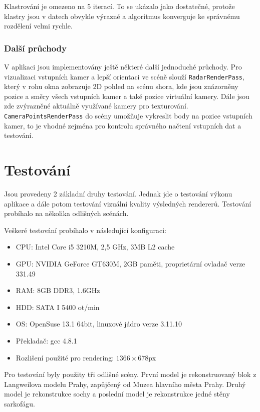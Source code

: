 \documentclass[11pt,twoside,a4paper]{book}
\begin{document}
Klastrování je omezeno na 5 iterací. To se ukázalo jako dostatečné, protože klastry jsou v datech obvykle výrazné a algoritmus konverguje ke správnému rozdělení velmi rychle.

\subsection{Další průchody}

V aplikaci jsou implementovány ještě některé další jednoduché průchody. Pro vizualizaci vstupních kamer a lepší orientaci ve scéně slouží \texttt{RadarRenderPass}, který v rohu okna zobrazuje 2D pohled na scénu shora, kde jsou znázorněny pozice a směry všech vstupních kamer a také pozice virtuální kamery. Dále jsou zde zvýrazněné aktuálně využívané kamery pro texturování. \texttt{CameraPointsRenderPass} do scény umožňuje vykreslit body na pozice vstupních kamer, to je vhodné zejména pro kontrolu správného načtení vstupních dat a testování.

\chapter{Testování}
\label{chap:testing}

Jsou provedeny 2 základní druhy testování. Jednak jde o testování výkonu aplikace a dále potom testování vizuální kvality výsledných rendererů. Testování probíhalo na několika odlišných scénách.

Veškeré testování probíhalo v následující konfiguraci:
\begin{itemize}
\item CPU:  Intel Core i5 3210M,  2,5 GHz, 3MB L2 cache
\item GPU:  NVIDIA GeForce GT630M, 2GB paměti, proprietární ovladač verze 331.49
\item RAM: 8GB  DDR3, 1.6GHz
\item HDD: SATA I 5400 ot/min
\item OS: OpenSuse 13.1 64bit, linuxové jádro verze 3.11.10
\item Překladač: gcc 4.8.1
\item Rozlišení použité pro rendering: $1366\times678$px
\end{itemize}

Pro testování byly použity tři odlišné scény. První model je rekonstruovaný blok z Langweilova modelu Prahy\cite{langweil}, zapůjčený od Muzea hlavního města Prahy.  Druhý model je rekonstrukce sochy a poslední model je rekonstrukce jedné stěny sarkofágu.
\end{document}
